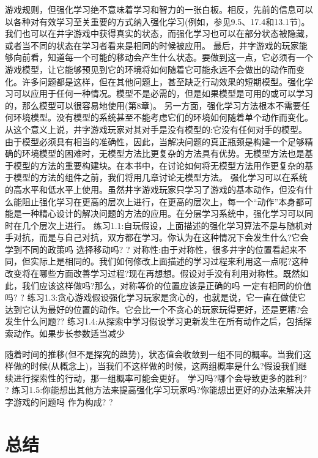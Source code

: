 游戏规则，但强化学习绝不意味着学习和智力的一张白板。相反，先前的信息可以以各种对有效学习至关重要的方式纳入强化学习(例如，参见9.5、17.4和13.1节)。我们也可以在井字游戏中获得真实的状态，而强化学习也可以在部分状态被隐藏，或者当不同的状态在学习者看来是相同的时候被应用。
最后，井字游戏的玩家能够向前看，知道每一个可能的移动会产生什么状态。要做到这一点，它必须有一个游戏模型，让它能够预见到它的环境将如何随着它可能永远不会做出的动作而变化。许多问题都是这样，但在其他问题上，甚至缺乏行动效果的短期模型。强化学习可以应用于任何一种情况。模型不是必需的，但是如果模型是可用的或可以学习的，那么模型可以很容易地使用(第8章)。
另一方面，强化学习方法根本不需要任何环境模型。没有模型的系统甚至不能考虑它们的环境如何随着单个动作而变化。从这个意义上说，井字游戏玩家对其对手是没有模型的:它没有任何对手的模型。由于模型必须具有相当的准确性，因此，当解决问题的真正瓶颈是构建一个足够精确的环境模型的困难时，无模型方法比更复杂的方法具有优势。无模型方法也是基于模型的方法的重要构建块。在本书中，在讨论如何将无模型方法用作更复杂的基于模型的方法的组件之前，我们将用几章讨论无模型方法。
强化学习可以在系统的高水平和低水平上使用。虽然井字游戏玩家只学习了游戏的基本动作，但没有什么能阻止强化学习在更高的层次上进行，在更高的层次上，每一个“动作”本身都可能是一种精心设计的解决问题的方法的应用。在分层学习系统中，强化学习可以同时在几个层次上进行。
练习1.1:自玩假设，上面描述的强化学习算法不是与随机对手对抗，而是与自己对抗，双方都在学习。你认为在这种情况下会发生什么?它会学到不同的政策吗
选择移动吗? 					?
对称性:由于对称性，很多井字的位置看起来不同，但实际上是相同的。我们如何修改上面描述的学习过程来利用这一点呢?这种改变将在哪些方面改善学习过程?现在再想想。假设对手没有利用对称性。既然如此，我们应该这样做吗?那么，对称等价的位置应该是正确的吗
一定有相同的价值吗? 					?
练习1.3:贪心游戏假设强化学习玩家是贪心的，也就是说，它一直在做使它达到它认为最好的位置的动作。它会比一个不贪心的玩家玩得更好，还是更糟?会发生什么问题??
练习1.4:从探索中学习假设学习更新发生在所有动作之后，包括探索动作。如果步长参数适当减少


随着时间的推移(但不是探究的趋势)，状态值会收敛到一组不同的概率。当我们这样做的时候(从概念上)，当我们不这样做的时候，这两组概率是什么?假设我们继续进行探索性的行动，那一组概率可能会更好。
学习吗?哪个会导致更多的胜利? 					?
练习1.5:你能想出其他方法来提高强化学习玩家吗?你能想出更好的办法来解决井字游戏的问题吗
作为构成? 					?


\section{总结}

